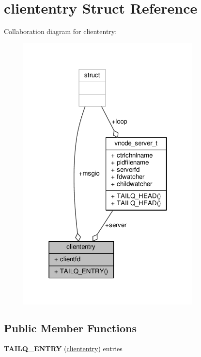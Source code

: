 \hypertarget{structcliententry}{\section{cliententry Struct Reference}
\label{structcliententry}
}


Collaboration diagram for cliententry\+:
\nopagebreak
\begin{figure}[H]
\begin{center}
\leavevmode
\includegraphics[width=262pt]{structcliententry__coll__graph}
\end{center}
\end{figure}
\subsection*{Public Member Functions}
\begin{DoxyCompactItemize}
\item 
\hypertarget{structcliententry_a0a69d40047ebfa79159dccaa10255be8}{{\bfseries T\+A\+I\+L\+Q\+\_\+\+E\+N\+T\+R\+Y} (\hyperlink{structcliententry}{cliententry}) entries}\label{structcliententry_a0a69d40047ebfa79159dccaa10255be8}

\end{DoxyCompactItemize}
